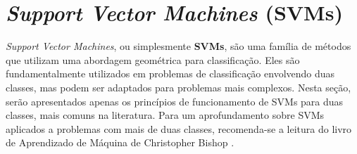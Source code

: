 



 

\section{\emph{Support Vector Machines} (SVMs)}
\label{subsection:SVMs}

\emph{Support Vector Machines}, ou simplesmente \textbf{SVMs}, são uma família de métodos que utilizam uma abordagem geométrica para classificação. Eles são fundamentalmente utilizados em problemas de classificação envolvendo duas classes, mas podem ser adaptados para problemas mais complexos. Nesta seção, serão apresentados apenas os princípios de funcionamento de SVMs para duas classes, mais comuns na literatura. Para um aprofundamento sobre SVMs aplicados a problemas com mais de duas classes, recomenda-se a leitura do livro de Aprendizado de Máquina de Christopher Bishop \cite{bishop}.

